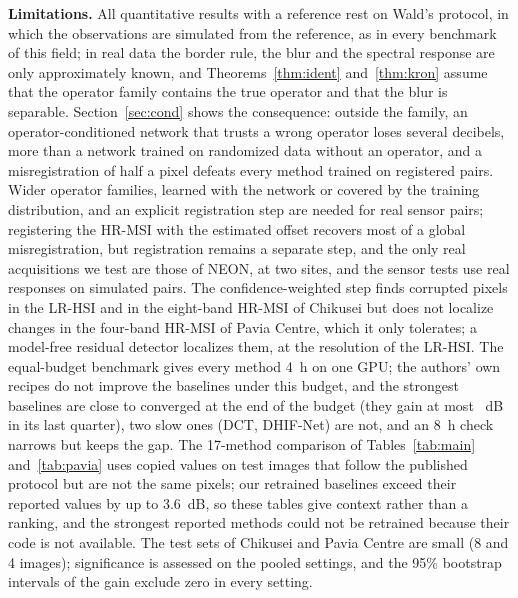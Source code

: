 \documentclass[journal]{IEEEtran}
\begin{document}
\textbf{Limitations.} All quantitative results with a reference rest on Wald's protocol, in which the observations are simulated from the reference, as in every benchmark of this field; in real data the border rule, the blur and the spectral response are only approximately known, and Theorems~\ref{thm:ident} and~\ref{thm:kron} assume that the operator family contains the true operator and that the blur is separable. Section~\ref{sec:cond} shows the consequence: outside the family, an operator-conditioned network that trusts a wrong operator loses several decibels, more than a network trained on randomized data without an operator, and a misregistration of half a pixel defeats every method trained on registered pairs. Wider operator families, learned with the network or covered by the training distribution, and an explicit registration step are needed for real sensor pairs; registering the HR-MSI with the estimated offset recovers most of a global misregistration, but registration remains a separate step, and the only real acquisitions we test are those of NEON, at two sites, and the sensor tests use real responses on simulated pairs. The confidence-weighted step finds corrupted pixels in the LR-HSI and in the eight-band HR-MSI of Chikusei but does not localize changes in the four-band HR-MSI of Pavia Centre, which it only tolerates; a model-free residual detector localizes them, at the resolution of the LR-HSI. The equal-budget benchmark gives every method 4~h on one GPU; the authors' own recipes do not improve the baselines under this budget, and the strongest baselines are close to converged at the end of the budget (they gain at most ~dB in its last quarter), two slow ones (DCT, DHIF-Net) are not, and an 8~h check narrows but keeps the gap. The 17-method comparison of Tables~\ref{tab:main} and~\ref{tab:pavia} uses copied values on test images that follow the published protocol but are not the same pixels; our retrained baselines exceed their reported values by up to 3.6~dB, so these tables give context rather than a ranking, and the strongest reported methods could not be retrained because their code is not available. The test sets of Chikusei and Pavia Centre are small (8 and 4 images); significance is assessed on the pooled settings, and the 95\% bootstrap intervals of the gain exclude zero in every setting.
\end{document}
